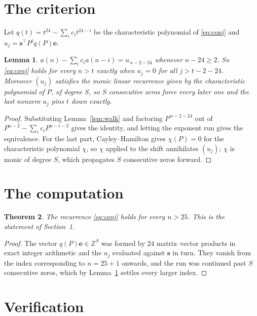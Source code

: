 \documentclass[11pt,a4paper]{article}
\theoremstyle{plain}
\newtheorem{theorem}{Theorem}
\newtheorem{lemma}[theorem]{Lemma}
\theoremstyle{definition}
\begin{document}
\section{The criterion}

Let $q(t)=t^{24}-\sum_i c_i t^{24-i}$ be the characteristic polynomial of
\eqref{eq:conj} and $u_j=\mathbf{s}^{\!\top}P^{j}q(P)\mathbf{e}$.

\begin{lemma}\label{lem:crit}
$a(n)-\sum_i c_i a(n-i)=u_{\,n-2-24}$ whenever $n-24\ge2$. So \eqref{eq:conj}
holds for every $n>t$ exactly when $u_j=0$ for all $j>t-2-24$. Moreover $(u_j)$
satisfies the monic linear recurrence given by the characteristic polynomial of $P$, of
degree $S$, so $S$ consecutive zeros force every later one and the last nonzero $u_j$ pins
$t$ down exactly.
\end{lemma}

\begin{proof}
Substituting Lemma~\ref{lem:walk} and factoring $P^{\,n-2-24}$ out of
$P^{n-2}-\sum_i c_i P^{n-i-2}$ gives the identity, and letting the exponent run gives the
equivalence. For the last part, Cayley--Hamilton gives $\chi(P)=0$ for the characteristic
polynomial $\chi$, so $\chi$ applied to the shift annihilates $(u_j)$; $\chi$ is monic of
degree $S$, which propagates $S$ consecutive zeros forward.
\end{proof}

\section{The computation}

\begin{theorem}
The recurrence \eqref{eq:conj} holds for every $n>25$. This is the statement of
Section~1.
\end{theorem}

\begin{proof}
The vector $q(P)\mathbf{e}\in\mathbb{Z}^{S}$ was formed by $24$ matrix--vector
products in exact integer arithmetic and the $u_j$ evaluated against $\mathbf{s}$ in turn.
They vanish from the index corresponding to $n=25+1$ onwards, and the run was continued
past $S$ consecutive zeros, which by Lemma~\ref{lem:crit} settles every larger index.
\end{proof}

\section{Verification}
\end{document}
